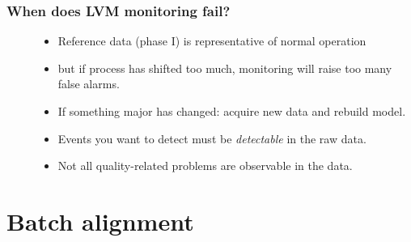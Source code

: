 \documentclass[handout, 12pt]{beamer}
\begin{document}
\begin{frame}\frametitle{When does LVM monitoring fail?}

\begin{description} 
	
	\item[] 
	
		\begin{itemize}
			\item	Reference data (phase I) is representative of normal operation
			
			\item	but if process has shifted too much, monitoring will raise too many false alarms.
			
			\item	If something major has changed: acquire new data and rebuild model.
		\end{itemize}
		
	\item[] 
	
		\begin{itemize}
			\item Events you want to detect must be \emph{detectable} in the raw data.
		
			\item	Not all quality-related problems are observable in the data.
		\end{itemize}
		
\end{description}
\end{frame}

\section{Batch alignment}
\end{document}
